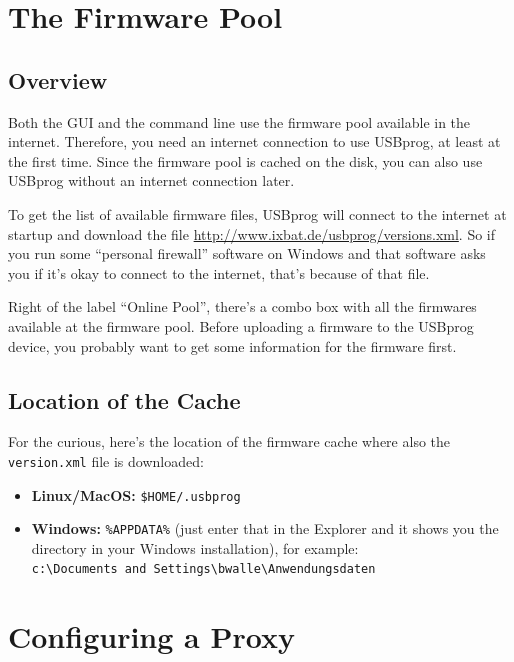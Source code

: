 \documentclass[bibtotoc,UKenglish,halfparskip,oneside,DIV12]{scrreprt}
\begin{document}
\section{The Firmware Pool}

\subsection{Overview}
\label{sec:firmwarepool_overview}

Both the GUI and the command line use the firmware pool available in the internet. Therefore, you
need an internet connection to use USBprog, at least at the first time. Since the firmware pool is
cached on the disk, you can also use USBprog without an internet connection later.

To get the list of available firmware files, USBprog will connect to the internet at startup and
download the file \url{http://www.ixbat.de/usbprog/versions.xml}. So if you run some ``personal
firewall'' software on Windows and that software asks you if it's okay to connect to the internet,
that's because of that file.

Right of the label ``Online Pool'', there's a combo box with all the firmwares available at the
firmware pool. Before uploading a firmware to the USBprog device, you probably want to get some
information for the firmware first.

\subsection{Location of the Cache}

For the curious, here's the location of the firmware cache where also the \texttt{version.xml} file
is downloaded:

\begin{itemize}
  \item \textbf{Linux/MacOS:} \texttt{\$HOME/.usbprog}
  \item \textbf{Windows:} \texttt{\%APPDATA\%} (just enter that in the Explorer and it shows you
    the directory in your Windows installation), for example: \\
    \texttt{c:\textbackslash{}Documents and Settings\textbackslash{}bwalle\textbackslash{}Anwendungsdaten}
\end{itemize}

\section{Configuring a Proxy}
\end{document}
